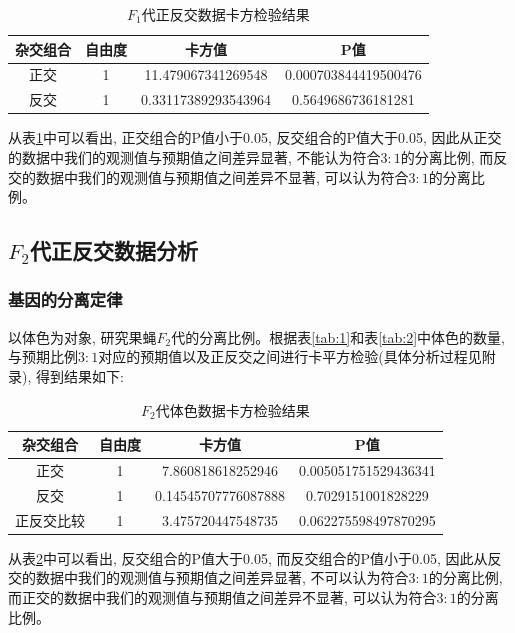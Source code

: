 \documentclass[AutoFakeBold]{LZUThesis}
\begin{document}
\begin{table}[htbp]
    \centering
    \caption{$F_1$代正反交数据卡方检验结果}
    \begin{tabular}{cccc}
        \toprule
        杂交组合 & 自由度 & 卡方值 & P值 \\
        \midrule
        正交 & 1 & 11.479067341269548 & 0.000703844419500476 \\
        反交 & 1 & 0.33117389293543964 & 0.5649686736181281 \\
        \bottomrule
    \end{tabular}
    \label{tab:3}
\end{table}

从表\ref{tab:3}中可以看出, 正交组合的P值小于0.05, 反交组合的P值大于0.05, 因此从正交的数据中我们的观测值与预期值之间差异显著, 不能认为符合$3:1$的分离比例, 而反交的数据中我们的观测值与预期值之间差异不显著, 可以认为符合$3:1$的分离比例。

\subsection{$F_2$代正反交数据分析}

\subsubsection{基因的分离定律}
以体色为对象, 研究果蝇$F_2$代的分离比例。根据表\ref{tab:1}和表\ref{tab:2}中体色的数量, 与预期比例$3:1$对应的预期值以及正反交之间进行卡平方检验(具体分析过程见附录), 得到结果如下:

\begin{table}[htbp]
    \centering
    \caption{$F_2$代体色数据卡方检验结果}
    \begin{tabular}{cccc}
        \toprule
        杂交组合 & 自由度 & 卡方值 & P值 \\
        \midrule
        正交 & 1 & 7.860818618252946 & 0.005051751529436341 \\
        反交 & 1 & 0.14545707776087888 & 0.7029151001828229 \\
        正反交比较 & 1 & 3.475720447548735 & 0.062275598497870295 \\
        \bottomrule
    \end{tabular}
    \label{tab:4}
\end{table}

从表\ref{tab:4}中可以看出, 反交组合的P值大于0.05, 而反交组合的P值小于0.05, 
因此从反交的数据中我们的观测值与预期值之间差异显著, 不可以认为符合$3:1$的分离比例, 
而正交的数据中我们的观测值与预期值之间差异不显著, 可以认为符合$3:1$的分离比例。
\end{document}
